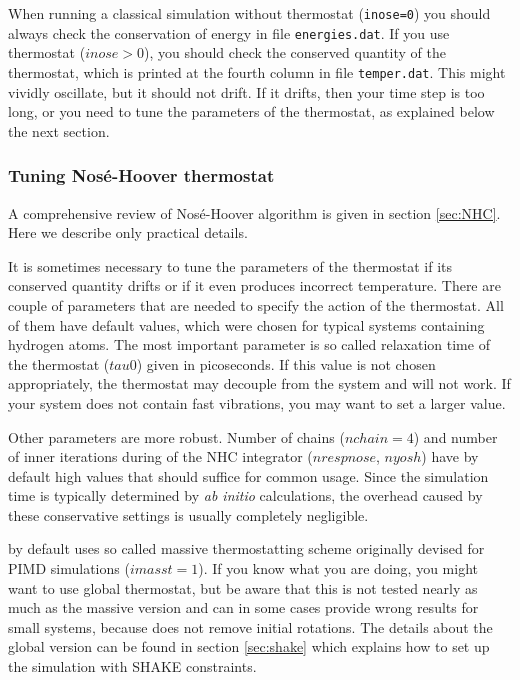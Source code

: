 When running a classical simulation without thermostat (\texttt{inose=0}) you should always check the conservation of energy in file \texttt{energies.dat}. If you use thermostat ($inose>0$), you should check the conserved quantity of the thermostat, which is printed at the fourth column in file \texttt{temper.dat}. This might vividly oscillate, but it should not drift. If it drifts, then your time step is too long, or you need to tune the parameters of the thermostat, as explained below the next section.

\subsubsection{Tuning Nosé-Hoover thermostat} 


A comprehensive review of Nosé-Hoover algorithm is given in section \ref{sec:NHC}. Here we describe only practical details.

It is sometimes necessary to tune the parameters of the thermostat if its conserved quantity drifts or if it even produces incorrect temperature. There are couple of parameters that are needed to specify the action of the thermostat. All of them have default values, which were chosen for typical systems containing hydrogen atoms. The most important parameter is so called relaxation time of the thermostat ($tau0$) given in picoseconds. If this value is not chosen appropriately, the thermostat may decouple from the system and will not work.
If your system does not contain fast vibrations, you may want to set a larger value.  

Other parameters are more robust. Number of chains ($nchain=4$) and number of inner iterations during of the NHC integrator ($nrespnose$, $nyosh$) have by default high values that should suffice for common usage. Since the simulation time is typically determined by \textit{ab initio} calculations, the overhead caused by these conservative settings is usually completely negligible.

\abin by default uses so called massive thermostatting scheme originally devised for PIMD simulations ($imasst=1$).
If you know what you are doing, you might want to use global thermostat, but be aware that this is not tested nearly as much as the massive version and can in some cases provide wrong results for small systems, because \abin does not remove initial rotations. The details about the global version can be found in section \ref{sec:shake} which explains how to set up the simulation with SHAKE constraints.


